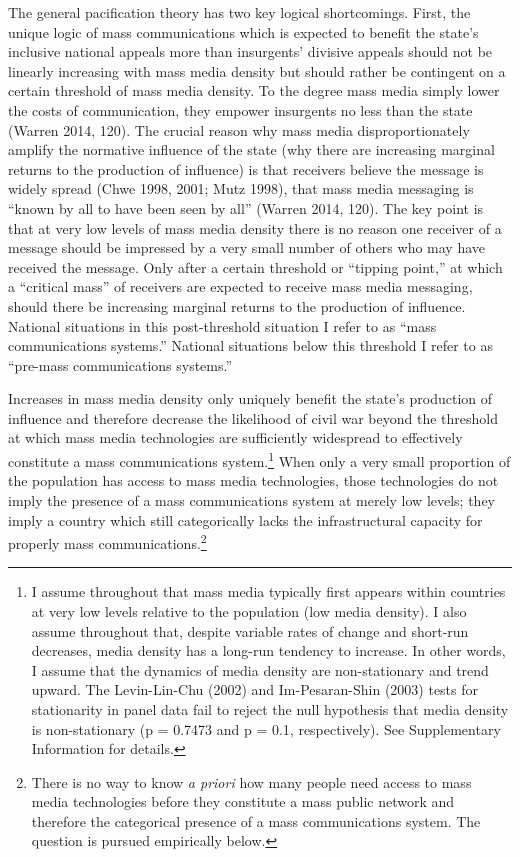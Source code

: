 \documentclass[12pt,article,oneside]{memoir}
\begin{document}
The general pacification theory has two key logical shortcomings. First,
the unique logic of mass communications which is expected to benefit the
state's inclusive national appeals more than insurgents' divisive
appeals should not be linearly increasing with mass media density but
should rather be contingent on a certain threshold of mass media
density. To the degree mass media simply lower the costs of
communication, they empower insurgents no less than the state (Warren
2014, 120). The crucial reason why mass media disproportionately amplify
the normative influence of the state (why there are increasing marginal
returns to the production of influence) is that receivers believe the
message is widely spread (Chwe 1998, 2001; Mutz 1998), that mass media
messaging is ``known by all to have been seen by all'' (Warren 2014,
120). The key point is that at very low levels of mass media density
there is no reason one receiver of a message should be impressed by a
very small number of others who may have received the message. Only
after a certain threshold or ``tipping point,'' at which a ``critical
mass'' of receivers are expected to receive mass media messaging, should
there be increasing marginal returns to the production of influence.
National situations in this post-threshold situation I refer to as
``mass communications systems.'' National situations below this
threshold I refer to as ``pre-mass communications systems.''

Increases in mass media density only uniquely benefit the state's
production of influence and therefore decrease the likelihood of civil
war beyond the threshold at which mass media technologies are
sufficiently widespread to effectively constitute a mass communications
system.\footnote{I assume throughout that mass media typically first
  appears within countries at very low levels relative to the population
  (low media density). I also assume throughout that, despite variable
  rates of change and short-run decreases, media density has a long-run
  tendency to increase. In other words, I assume that the dynamics of
  media density are non-stationary and trend upward. The Levin-Lin-Chu
  (2002) and Im-Pesaran-Shin (2003) tests for stationarity in panel data
  fail to reject the null hypothesis that media density is
  non-stationary (p = 0.7473 and p = 0.1, respectively). See
  Supplementary Information for details.} When only a very small
proportion of the population has access to mass media technologies,
those technologies do not imply the presence of a mass communications
system at merely low levels; they imply a country which still
categorically lacks the infrastructural capacity for properly mass
communications.\footnote{There is no way to know \emph{a priori} how
  many people need access to mass media technologies before they
  constitute a mass public network and therefore the categorical
  presence of a mass communications system. The question is pursued
  empirically below.}
\end{document}
